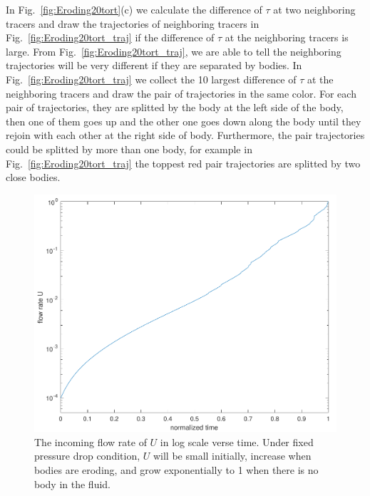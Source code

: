\documentclass[preprint, 10pt]{elsarticle}
\begin{document}
{\color{red}
In Fig.~\ref{fig:Eroding20tort}(c) we calculate the difference of 
$\tau$ at two neighboring tracers 
and draw the trajectories of neighboring tracers in 
Fig.~\ref{fig:Eroding20tort_traj}
if the difference of $\tau$ at the neighboring tracers is large. 
From Fig.~\ref{fig:Eroding20tort_traj},
 we are able to tell the neighboring trajectories will be very 
different if they are separated by bodies. In Fig.~\ref{fig:Eroding20tort_traj}
we collect the 10 largest difference of $\tau$ at the neighboring tracers and 
draw the pair of trajectories in the same color. For each pair of trajectories, 
they are splitted by the body at the left side of the body, then
one of them goes up and the other one goes down along the body 
until they rejoin with each other at the right side of body.  
Furthermore, the pair trajectories could be splitted by more than one body, 
for example in Fig.~\ref{fig:Eroding20tort_traj} the toppest red pair trajectories 
are splitted by two close bodies.
}





\begin{figure}[H]
\center
\includegraphics*[width =0.5\linewidth]{./figs/flow_rate20dense}
\caption{\label{fig:Eroding20flowrate}  The incoming flow rate of $U$ in log scale verse time. 
Under fixed pressure drop condition, $U$ will be small initially,
increase when bodies are eroding, and grow exponentially 
to 1 when there is no body in the fluid. }
\end{figure}
\end{document}
